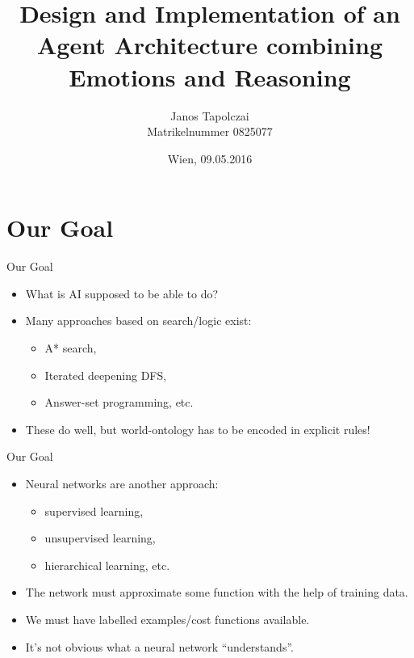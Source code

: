 \documentclass{beamer}
\title{Design and Implementation of an Agent Architecture combining Emotions and Reasoning}
\author{Janos Tapolczai\\ Matrikelnummer 0825077}
\date{Wien, 09.05.2016}
\begin{document}
   
   \begin{frame}
      \titlepage
   \end{frame}
   
   \section{Our Goal}
   
   \begin{frame}{Our Goal}
         \begin{itemize}
            \item What is AI supposed to be able to do?
            \pause
            \item Many approaches based on search/logic exist:
               \begin{itemize}
                  \item A* search,
                  \item Iterated deepening DFS,
                  \item Answer-set programming, etc.
               \end{itemize}
            \pause
            \item These do well, but world-ontology has to be encoded in explicit rules!
         \end{itemize}
   \end{frame}

   \begin{frame}{Our Goal}
      \begin{itemize}
         \item Neural networks are another approach:
         \begin{itemize}
            \item supervised learning,
            \item unsupervised learning,
            \item hierarchical learning, etc.
         \end{itemize}
         \pause
         \item The network must approximate some function with the help of training data.
         \pause
         \item We must have labelled examples/cost functions available.
         \pause
         \item It's not obvious what a neural network ``understands''.
      \end{itemize}
   \end{frame}
   
\end{document}
